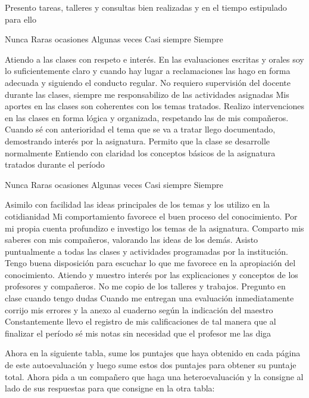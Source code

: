 \documentclass[10pt,letterpaper,addpoints]{exam}
\begin{document}
\begin{questions}
\question[5]
Presento tareas, talleres y consultas bien realizadas y en el tiempo estipulado para ello

\begin{oneparchoices}
\choice[1] Nunca
\choice[2] Raras ocasiones
\choice[3] Algunas veces
\choice[4] Casi siempre
\choice[5] Siempre 
\end{oneparchoices}
\answerline
\question[5]
Atiendo a las clases con respeto e interés.
\answerline
\question[5]
En las evaluaciones escritas y orales soy lo suficientemente claro y cuando hay lugar a reclamaciones las hago en forma adecuada y siguiendo el conducto regular.
\answerline
\question[5]
No requiero supervisión del docente durante las clases, siempre me responsabilizo de las actividades asignadas
\answerline
\question[5] Mis aportes en las clases son coherentes con los temas tratados.
\answerline
\question[5] Realizo intervenciones en las clases en forma lógica y organizada, respetando las de mis compañeros.
\answerline
\question[5] Cuando sé con anterioridad el tema que se va a tratar llego documentado, demostrando interés por la asignatura.
\answerline
\question[5] Permito que la clase se desarrolle normalmente
\answerline
\question[5] Entiendo con claridad los conceptos básicos de la asignatura tratados durante el período

\begin{oneparchoices}
\choice[1] Nunca
\choice[2] Raras ocasiones
\choice[3] Algunas veces
\choice[4] Casi siempre
\choice[5] Siempre 
\end{oneparchoices}
\answerline
\question[5] Asimilo con facilidad las ideas principales de los temas y los utilizo en la cotidianidad
\answerline
\question[5] Mi comportamiento favorece el buen proceso del conocimiento.
\answerline
\question[5] Por mi propia cuenta profundizo e investigo los temas de la asignatura.
\answerline
\question[5] Comparto mis saberes con mis compañeros, valorando las ideas de los demás.
\answerline
\question[5] Asisto puntualmente a todas las clases y actividades programadas por la institución.
\answerline
\question[5] Tengo buena disposición para escuchar lo que me favorece en la apropiación del conocimiento.
\answerline
\question[5] Atiendo y muestro interés por las explicaciones y conceptos de los profesores y compañeros.
\answerline
\question[5] No me copio de los talleres y trabajos.
\answerline
\question[5] Pregunto en clase cuando tengo dudas
\answerline
\question[5] Cuando me entregan una evaluación inmediatamente corrijo mis errores y la anexo al cuaderno según la indicación del maestro
\answerline
\question[5] Constantemente llevo el registro de mis calificaciones de tal manera que al finalizar el período sé mis notas sin necesidad que el profesor me las diga
\answerline
\end{questions}
Ahora en la siguiente tabla, sume los puntajes que haya obtenido en cada página de este autoevaluación y luego sume estos dos puntajes para obtener su puntaje total. Ahora pida a un compañero que haga una heteroevaluación y la consigne al lado de sus respuestas para que consigne en la otra tabla:
\end{document}

